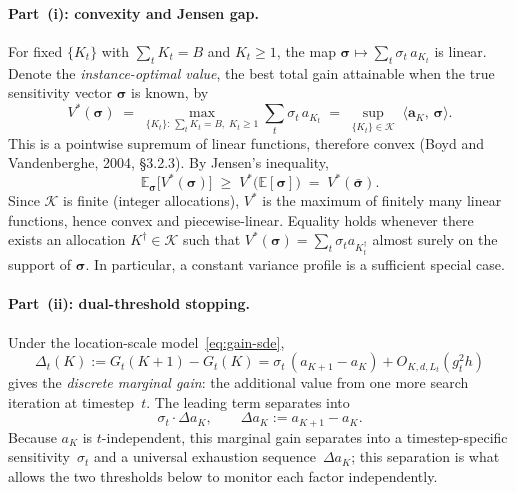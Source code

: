 \paragraph{Part~(i): convexity and Jensen gap.}
For fixed $\{K_t\}$ with $\sum_t K_t=B$ and $K_t\ge 1$, the map
$\boldsymbol{\sigma}\mapsto\sum_t\sigma_t\,a_{K_t}$ is linear.
Denote the \emph{instance-optimal value}, the best total gain attainable
when the true sensitivity vector $\boldsymbol{\sigma}$ is known, by
\[
  V^*(\boldsymbol{\sigma})
  \;=\;
  \max_{\{K_t\}:\,\sum_t K_t=B,\;K_t\ge 1}
  \sum_t\sigma_t\,a_{K_t}
  \;=\;
  \sup_{\{K_t\}\in\mathcal{K}}\;
  \langle\boldsymbol{a}_K,\,\boldsymbol{\sigma}\rangle.
\]
This is a pointwise supremum of linear functions, therefore convex
(Boyd and Vandenberghe, 2004, \S3.2.3).
By Jensen's inequality,
\[
  \mathbb{E}_{\boldsymbol{\sigma}}
  \bigl[V^*(\boldsymbol{\sigma})\bigr]
  \;\ge\;
  V^*\!\bigl(\mathbb{E}[\boldsymbol{\sigma}]\bigr)
  \;=\;
  V^*(\bar{\boldsymbol{\sigma}}).
\]
Since $\mathcal{K}$ is finite (integer allocations), $V^*$ is the
maximum of finitely many linear functions, hence convex and
piecewise-linear.
Equality holds whenever there exists an allocation
$K^\dagger\in\mathcal{K}$ such that
$V^*(\boldsymbol{\sigma})=\sum_t \sigma_t a_{K_t^\dagger}$ almost
surely on the support of $\boldsymbol{\sigma}$.
In particular, a constant variance profile is a sufficient special case.

\paragraph{Part~(ii): dual-threshold stopping.}
Under the location-scale model~\eqref{eq:gain-sde},
\[
  \Delta_t(K)
  := G_t(K+1)-G_t(K)
  = \sigma_t\,(a_{K+1}-a_K) + O_{K,d,L_t}(g_t^2 h)
\]
gives the \emph{discrete marginal gain}: the additional value from one
more search iteration at timestep~$t$.
The leading term separates into
\[
  \sigma_t\cdot \Delta a_K,
  \qquad
  \Delta a_K:=a_{K+1}-a_K .
\]
Because $a_K$ is $t$-independent, this marginal gain separates into a
timestep-specific sensitivity~$\sigma_t$ and a universal exhaustion
sequence~$\Delta a_K$; this separation is what allows the two
thresholds below to monitor each factor independently.

